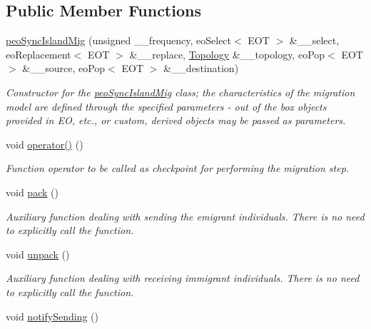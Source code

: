 \subsection*{Public Member Functions}
\begin{CompactItemize}
\item 
\hyperlink{classpeoSyncIslandMig_96b7b6de20b5e318a8b1cde76842305c}{peo\-Sync\-Island\-Mig} (unsigned \_\-\_\-frequency, eo\-Select$<$ EOT $>$ \&\_\-\_\-select, eo\-Replacement$<$ EOT $>$ \&\_\-\_\-replace, \hyperlink{classTopology}{Topology} \&\_\-\_\-topology, eo\-Pop$<$ EOT $>$ \&\_\-\_\-source, eo\-Pop$<$ EOT $>$ \&\_\-\_\-destination)
\begin{CompactList}\small\item\em Constructor for the \hyperlink{classpeoSyncIslandMig}{peo\-Sync\-Island\-Mig} class; the characteristics of the migration model are defined through the specified parameters - out of the box objects provided in EO, etc., or custom, derived objects may be passed as parameters. \item\end{CompactList}\item 
void \hyperlink{classpeoSyncIslandMig_178476fd276f78b73607b33d19522c36}{operator()} ()
\begin{CompactList}\small\item\em Function operator to be called as checkpoint for performing the migration step. \item\end{CompactList}\item 
\hypertarget{classpeoSyncIslandMig_e334188141eeba9f7b78bc6716f819ad}{
void \hyperlink{classpeoSyncIslandMig_e334188141eeba9f7b78bc6716f819ad}{pack} ()}
\label{classpeoSyncIslandMig_e334188141eeba9f7b78bc6716f819ad}

\begin{CompactList}\small\item\em Auxiliary function dealing with sending the emigrant individuals. There is no need to explicitly call the function. \item\end{CompactList}\item 
\hypertarget{classpeoSyncIslandMig_85777bd9f709c5d4107799e8619948d1}{
void \hyperlink{classpeoSyncIslandMig_85777bd9f709c5d4107799e8619948d1}{unpack} ()}
\label{classpeoSyncIslandMig_85777bd9f709c5d4107799e8619948d1}

\begin{CompactList}\small\item\em Auxiliary function dealing with receiving immigrant individuals. There is no need to explicitly call the function. \item\end{CompactList}\item 
\hypertarget{classpeoSyncIslandMig_8c427b3f91c19ff85f86930366b96008}{
void \hyperlink{classpeoSyncIslandMig_8c427b3f91c19ff85f86930366b96008}{notify\-Sending} ()}
\label{classpeoSyncIslandMig_8c427b3f91c19ff85f86930366b96008}


\end{CompactItemize}
